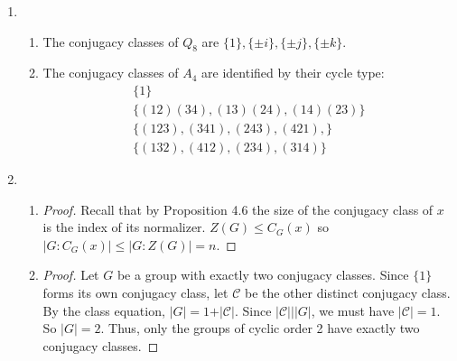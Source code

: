 \documentclass[11pt, letterpaper]{article}
\begin{document}
\thispagestyle{firststyle}


\begin{enumerate}
  \item \begin{enumerate}
    \item The conjugacy classes of $Q_8$ are $\lbrace 1 \rbrace, \lbrace \pm i \rbrace, \lbrace \pm j \rbrace, \lbrace \pm k \rbrace$.
    \item The conjugacy classes of $A_4$ are identified by their cycle type: \begin{gather*}
      \lbrace 1 \rbrace \\
      \lbrace (12)(34), (13)(24), (14)(23) \rbrace \\
      \lbrace (123), (341), (243), (421), \rbrace \\
      \lbrace (132), (412), (234), (314) \rbrace
    \end{gather*}
  \end{enumerate}

  \item \begin{enumerate}
    \item \begin{proof}
      Recall that by Proposition 4.6 the size of the conjugacy class of $x$ is the index of its normalizer. $Z(G) \leq C_G(x)$ so $\vert G : C_G(x) \vert \leq \vert G : Z(G) \vert = n$.
    \end{proof}
    \item \begin{proof}
      Let $G$ be a group with exactly two conjugacy classes. Since $\lbrace 1 \rbrace$ forms its own conjugacy class, let $\mathcal C$ be the other distinct conjugacy class. By the class equation, $\vert G \vert = 1 + \vert \mathcal C \vert$. Since $\vert \mathcal C \vert \mid \vert G \vert$, we must have $\vert \mathcal C \vert = 1$. So $\vert G \vert = 2$. Thus, only the groups of cyclic order 2 have exactly two conjugacy classes.
    \end{proof}
  \end{enumerate}


\end{enumerate}
\end{document}
